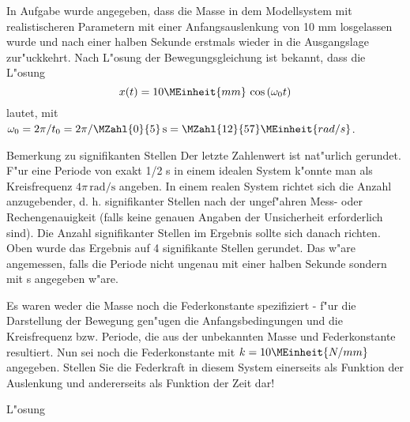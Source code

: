 \begin{MExercises}
\begin{MExercise}
In Aufgabe  wurde angegeben, dass die Masse in dem Modellsystem mit realistischeren Parametern mit einer Anfangsauslenkung von 10 mm losgelassen wurde und nach einer halben Sekunde erstmals wieder in die Ausgangslage zur"uckkehrt. Nach L"osung der Bewegungsgleichung ist bekannt, dass die L"osung
\begin{equation}
  x(t) = 10\MEinheit{mm}\,\cos\left(\omega_0t\right)
\end{equation}
lautet, mit $\omega_0=2\pi/t_0=2\pi/\MZahl{0}{5} \, \mathrm{s} = \MZahl{12}{57}\MEinheit{rad/s}$. 

  \begin{MHint}{Bemerkung zu signifikanten Stellen}
  Der letzte Zahlenwert ist nat"urlich gerundet. F"ur eine Periode von exakt 1/2 s in einem idealen System k"onnte man als Kreisfrequenz $4\pi\,\mathrm{rad/s}$ angeben. In einem realen System richtet sich die Anzahl anzugebender, d. h. signifikanter Stellen nach der ungef"ahren Mess- oder Rechengenauigkeit (falls keine genauen Angaben der Unsicherheit erforderlich sind). Die Anzahl signifikanter Stellen im Ergebnis sollte sich danach richten. Oben wurde das Ergebnis auf 4 signifikante Stellen gerundet. Das w"are angemessen, falls die Periode nicht ungenau mit einer halben Sekunde sondern mit  s angegeben w"are.
  \end{MHint}


Es waren weder die Masse noch die Federkonstante spezifiziert - f"ur die Darstellung der Bewegung gen"ugen die Anfangsbedingungen und die Kreisfrequenz bzw. Periode, die aus der unbekannten Masse und Federkonstante resultiert. Nun sei noch die Federkonstante mit $k=10\MEinheit{N/mm}$ angegeben. Stellen Sie die Federkraft in diesem System einerseits als Funktion der Auslenkung und andererseits als Funktion der Zeit dar!

\begin{MHint}{L"osung} 
\begin{center}
  \end{center}


\end{MHint}
\end{MExercise}
\end{MExercises}
